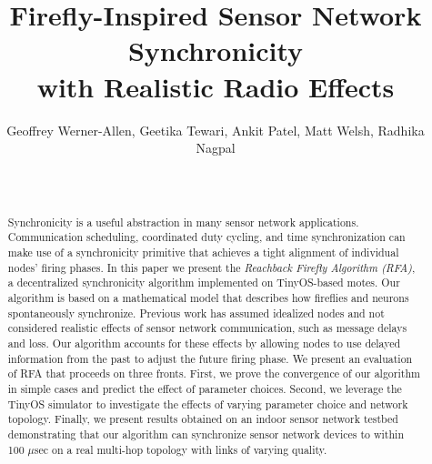 \documentclass{sig-alternate}
\begin{document}



\title{Firefly-Inspired Sensor Network Synchronicity\\ with Realistic Radio Effects}
\author{
Geoffrey Werner-Allen, Geetika Tewari, Ankit Patel, Matt Welsh, Radhika Nagpal\\
 \\
 \\
}

\maketitle


\begin{abstract}

Synchronicity is a useful abstraction in many sensor network
applications. Communication scheduling, coordinated duty cycling, and
time synchronization can make use of a synchronicity primitive that
achieves a tight alignment of individual nodes' firing phases. In this
paper we present the {\em Reachback Firefly Algorithm (RFA)}, a
decentralized synchronicity algorithm implemented on TinyOS-based
motes. Our algorithm is based on a mathematical model that describes
how fireflies and neurons spontaneously synchronize. Previous work has
assumed idealized nodes and not considered realistic effects of sensor
network communication, such as message delays and loss. Our algorithm
accounts for these effects by allowing nodes to use delayed
information from the past to adjust the future firing phase. We
present an evaluation of RFA that proceeds on three fronts. First, we
prove the convergence of our algorithm in simple cases and predict the
effect of parameter choices. Second, we leverage the TinyOS simulator
to investigate the effects of varying parameter choice and network
topology. Finally, we present results obtained on an indoor sensor
network testbed demonstrating that our algorithm can synchronize
sensor network devices to within 100 $\mu$sec on a real multi-hop
topology with links of varying quality.

\end{abstract}
\end{document}
